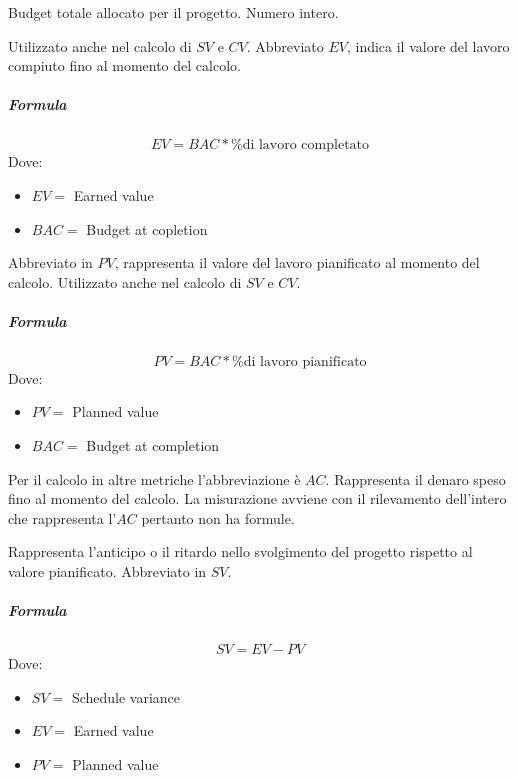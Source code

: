         Budget totale allocato per il progetto.
         Numero intero.
        
        
        Utilizzato anche nel calcolo di $SV$ e $CV$. Abbreviato $EV$, indica il valore del lavoro compiuto fino al momento del calcolo.
        \subparagraph{Formula}
        \begin{displaymath}
          EV = BAC * \% \textrm{di lavoro completato}
        \end{displaymath}
        Dove:
        \begin{itemize}
            \item[] $EV =$ Earned value
            \item[] $BAC =$ Budget at copletion
        \end{itemize}
         
        
        
        Abbreviato in $PV$, rappresenta il valore del lavoro pianificato al momento del calcolo. Utilizzato anche nel calcolo di $SV$ e $CV$.
        \subparagraph{Formula}
        \begin{displaymath}
          PV = BAC * \% \textrm{di lavoro pianificato}
        \end{displaymath}
        Dove:
        \begin{itemize}
            \item[] $PV =$ Planned value
            \item[] $BAC =$ Budget at completion
        \end{itemize}
         
        
        Per il calcolo in altre metriche l'abbreviazione è $AC$.
        Rappresenta il denaro speso fino al momento del calcolo.
         La misurazione avviene con il rilevamento dell'intero che rappresenta l'$AC$ pertanto non ha formule.
        
        
        Rappresenta l'anticipo o il ritardo nello svolgimento del progetto rispetto al valore pianificato. Abbreviato in $SV$.
        \subparagraph{Formula}
        \begin{displaymath}
          SV = EV - PV
        \end{displaymath}
        Dove:
        \begin{itemize}
            \item[] $SV =$ Schedule variance
            \item[] $EV =$ Earned value
            \item[] $PV =$ Planned value
        \end{itemize}
        
